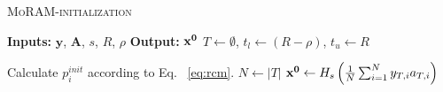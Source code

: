 \begin{algorithm}[t]
	\caption{\textsc{MoRAM-initialization}}
	\label{alg:RCM}
	\begin{algorithmic}
		\State\textbf{Inputs:} $\mathbf{y}$, $\mathbf{A}$, $s$, $R$, $\rho$
		\State\textbf{Output:}  $\mathbf{x^0}$
		\State $T \leftarrow \emptyset$, $t_l \leftarrow (R-\rho)$, $t_u \leftarrow R$
%		
		
		\EndIf
		\State Calculate $p^{init}_i$ according to Eq. ~\ref{eq:rcm}.
		\EndFor
		\State $N \leftarrow |T|$
		\State $\mathbf{x^0} \leftarrow H_s\left( \frac{1}{N}\sum_{i=1}^{N}y_{T,i}a_{T,i}\right)$
	\end{algorithmic}
\end{algorithm}

